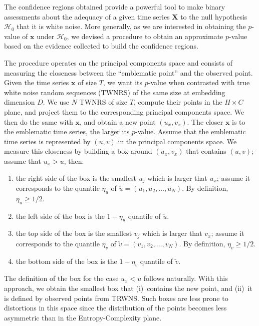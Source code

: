 \documentclass[a4,11pt]{pssbmac}
\begin{document}
The confidence regions obtained provide a powerful tool to make binary assessments about the adequacy of a given time series $\bm X$ to the null hypothesis $\mathcal H_0$ that it is white noise.
More generally, as we are interested in obtaining the $p$-value of $\bm x$ under $\mathcal H_0$, we devised a procedure to obtain an approximate $p$-value based on the evidence collected to build the confidence regions.

The procedure operates on the principal components space and consists of measuring the closeness between the ``emblematic point'' and the observed point.
Given the time series $\bm x$ of size $T$, we want its $p$-value when contrasted with true white noise random sequences (TWNRS) of the same size at embedding dimension $D$.
We use $N$ TWNRS of size $T$, compute their points in the $H\times C$ plane, and project them to the corresponding principal components space.
We then do the same with $\bm x$, and obtain a new point $(u_x,v_x)$.
The closer $\bm x$ is to the emblematic time series, the larger its $p$-value.
Assume that the emblematic time series is represented by $(u,v)$ in the principal components space.
We measure this closeness by building a box around $(u_x,v_x)$ that contains $(u,v)$; assume that $u_x>u$, then:
\begin{enumerate}
	\item the right side of the box is the smallest $u_j$ which is larger that $u_x$; assume it corresponds to the quantile $\eta_u$ of $\utilde u = (u_1,u_2,\dots, u_N)$. By definition, $\eta_u\geq 1/2$.
	\item the left side of the box is the $1-\eta_u$ quantile of $\utilde u$.
	\item the top side of the box is the smallest $v_j$ which is larger that $v_x$; assume it corresponds to the quantile $\eta_v$ of $\utilde v = (v_1,v_2,\dots, v_N)$. By definition, $\eta_v\geq 1/2$.
	\item the bottom side of the box is the $1-\eta_v$ quantile of $\utilde v$.
\end{enumerate}

The definition of the box for the case $u_x<u$ follows naturally.
With this approach, we obtain the smallest box that (i)~contains the new point, and (ii)~it is defined by observed points from TRWNS.
Such boxes are less prone to distortions in this space since the distribution of the points becomes less asymmetric than in the Entropy-Complexity plane.
\end{document}
